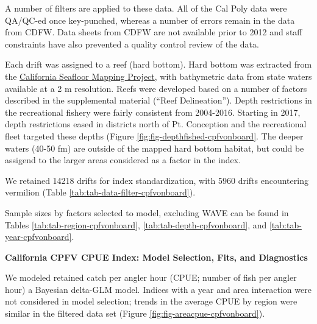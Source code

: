\documentclass[11pt,
  english,
  a4paper,
]{article}
\begin{document}
A number of filters are applied to these data. All of the Cal Poly data were QA/QC-ed once key-punched, whereas a number of errors remain in the data from CDFW. Data sheets from CDFW are not available prior to 2012 and staff constraints have also prevented a quality control review of the data.

Each drift was assigned to a reef (hard bottom). Hard bottom was extracted from the {\href{http://seafloor.otterlabs.org/index.html}{California Seafloor Mapping Project}\leavevmode\tagmcend\tagstructend}, with bathymetric data from state waters available at a 2 m resolution. Reefs were developed based on a number of factors described in the supplemental material (``Reef Delineation''). Depth restrictions in the recreational fishery were fairly consistent from 2004-2016. Starting in 2017, depth restrictions eased in districts north of Pt. Conception and the recreational fleet targeted these depths (Figure \ref{fig:fig-depthfished-cpfvonboard}. The deeper waters (40-50 fm) are outside of the mapped hard bottom habitat, but could be assigend to the larger areas considered as a factor in the index.

We retained 14218 drifts for index standardization, with 5960 drifts encountering vermilion (Table \ref{tab:tab-data-filter-cpfvonboard}).

Sample sizes by factors selected to model, excluding WAVE can be found in Tables \ref{tab:tab-region-cpfvonboard}, \ref{tab:tab-depth-cpfvonboard}, and \ref{tab:tab-year-cpfvonboard}.

\textbf{California CPFV CPUE Index: Model Selection, Fits, and Diagnostics}

We modeled retained catch per angler hour (CPUE; number of fish per angler hour) a Bayesian delta-GLM model. Indices with a year and area interaction were not considered in model selection; trends in the average CPUE by region were similar in the filtered data set (Figure \ref{fig:fig-areacpue-cpfvonboard}).
\end{document}
